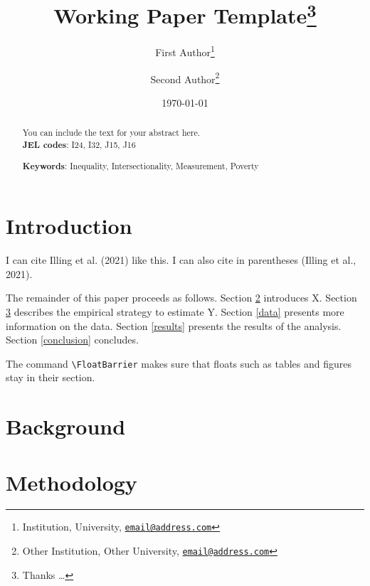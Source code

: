\documentclass[
  11pt,
a4paper
]{article}
\title{Working Paper Template\thanks{Thanks \ldots{}}}
\author{First Author\footnote{Institution, University, \href{mailto:email@address.com}{\nolinkurl{email@address.com}}} \and Second Author\footnote{Other Institution, Other University, \href{mailto:email@address.com}{\nolinkurl{email@address.com}}}}
\date{\today}
\begin{document}
\maketitle
\thispagestyle{empty} %
\begin{abstract}
  \noindent You can include the text for your abstract here.\\
  
  \noindent \textbf{JEL codes}: I24, I32, J15, J16
    
  \noindent \textbf{Keywords}: Inequality, Intersectionality, Measurement, Poverty
  \end{abstract}
\restoregeometry

\hypertarget{introduction}{%
\section{Introduction}\label{introduction}}

I can cite Illing et al. (2021) like this. I can also cite in parentheses (Illing et al., 2021).

The remainder of this paper proceeds as follows. Section \ref{background} introduces X. Section \ref{methods} describes the empirical strategy to estimate Y. Section \ref{data} presents more information on the data. Section \ref{results} presents the results of the analysis. Section \ref{conclusion} concludes.

The command \texttt{\textbackslash{}FloatBarrier} makes sure that floats such as tables and figures stay in their section.
\FloatBarrier 

\hypertarget{background}{%
\section{Background}\label{background}}

\FloatBarrier

\hypertarget{methods}{%
\section{Methodology}\label{methods}}
\end{document}
